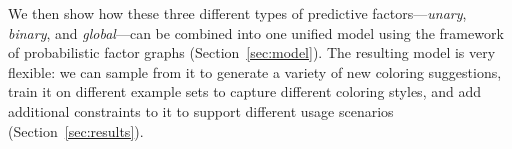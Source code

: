 We then show how these three different types of predictive factors---\emph{unary}, \emph{binary}, and \emph{global}---can be combined into one unified model using the framework of probabilistic factor graphs (Section~\ref{sec:model}). The resulting model is very flexible: we can sample from it to generate a variety of new coloring suggestions, train it on different example sets to capture different coloring styles, and add additional constraints to it to support different usage scenarios (Section~\ref{sec:results}).

%
